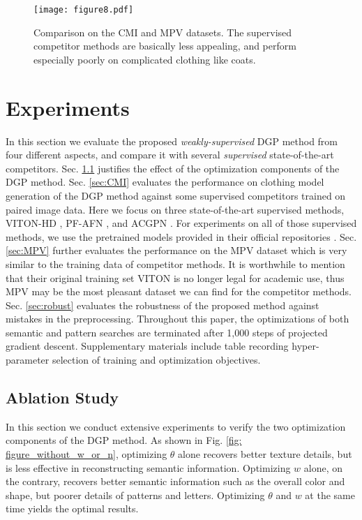 \documentclass[10pt,twocolumn,letterpaper]{article}
\begin{document}
\begin{figure*}[t]
  \centering
  \texttt{[image: figure8.pdf]}\caption{Comparison on the CMI and MPV datasets. The supervised competitor methods are basically less appealing, and perform especially poorly on complicated clothing like coats.}\label{fig: compare_CMI}\end{figure*}

\section{Experiments}
In this section we evaluate the proposed \textit{weakly-supervised} DGP method from four different aspects, and compare it with several \textit{supervised} state-of-the-art competitors. Sec. \ref{sec:ablation} justifies the effect of the optimization components of the DGP method. Sec. \ref{sec:CMI} evaluates the performance on clothing model generation of the DGP method against some supervised competitors trained on paired image data. Here we focus on three state-of-the-art supervised methods, VITON-HD \cite{choi2021viton}, PF-AFN \cite{ge2021parser,han2019clothflow}, and ACGPN \cite{yang2020towards}. For experiments on all of those supervised methods, we use the pretrained models provided in their official repositories \cite{vitonhdcode,acpgncode,pfancode}. Sec. \ref{sec:MPV} further evaluates the performance on the MPV \cite{dong2019towards} dataset which is very similar to the training data \cite{han2018viton} of competitor methods. It is worthwhile to mention that their original training set VITON \cite{han2018viton} is no longer legal for academic use, thus MPV \cite{dong2019towards} may be the most pleasant dataset we can find for the competitor methods. Sec. \ref{sec:robust} evaluates the robustness of the proposed method against mistakes in the preprocessing. Throughout this paper, the optimizations of both semantic and pattern searches are terminated after 1,000 steps of projected gradient descent. Supplementary materials include table recording hyper-parameter selection of training and optimization objectives.

\subsection{Ablation Study}\label{sec:ablation}
In this section we conduct extensive experiments to verify the two optimization components of the DGP method. 
As shown in Fig. \ref{fig: figure_without_w_or_n}, optimizing $\theta$ alone recovers better texture details, but is less effective in reconstructing semantic information.
Optimizing $w$ alone, on the contrary, recovers better semantic information such as the overall color and shape, but poorer details of patterns and letters. Optimizing $\theta$ and $w$ at the same time yields the optimal results.
\end{document}
